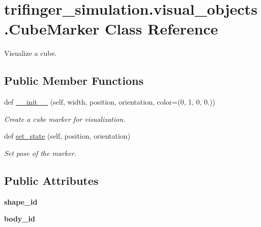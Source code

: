 \hypertarget{classtrifinger__simulation_1_1visual__objects_1_1CubeMarker}{}\section{trifinger\+\_\+simulation.\+visual\+\_\+objects.\+Cube\+Marker Class Reference}
\label{classtrifinger__simulation_1_1visual__objects_1_1CubeMarker}


Visualize a cube.  


\subsection*{Public Member Functions}
\begin{DoxyCompactItemize}
\item 
def \hyperlink{classtrifinger__simulation_1_1visual__objects_1_1CubeMarker_a1e9cc5319d4cd0ec27a594c2a4fbb69d}{\+\_\+\+\_\+init\+\_\+\+\_\+} (self, width, position, orientation, color=(0, 1, 0, 0.))
\begin{DoxyCompactList}\small\item\em Create a cube marker for visualization. \end{DoxyCompactList}\item 
def \hyperlink{classtrifinger__simulation_1_1visual__objects_1_1CubeMarker_a76e7dc46d15bc36fa10ec09f18cb2f26}{set\+\_\+state} (self, position, orientation)
\begin{DoxyCompactList}\small\item\em Set pose of the marker. \end{DoxyCompactList}\end{DoxyCompactItemize}
\subsection*{Public Attributes}
\begin{DoxyCompactItemize}
\item 
\mbox{\label{classtrifinger__simulation_1_1visual__objects_1_1CubeMarker_ac52687f329f1aef4504ca98369ebce9f}} 
{\bfseries shape\+\_\+id}
\item 
\mbox{\label{classtrifinger__simulation_1_1visual__objects_1_1CubeMarker_a21e3207e9d62ed27ebc2e15b640a4118}} 
{\bfseries body\+\_\+id}
\end{DoxyCompactItemize}


